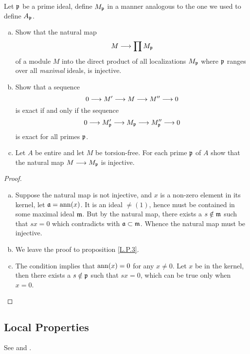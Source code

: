   \begin{ex}\label{3.ex10}
    Let $\mathfrak{p}$ be a prime ideal, define $M_{\mathfrak{p}}$ in a manner analogous to the one we used to define $A_{\mathfrak{p}}$.
    \begin{enumerate}[a)]
      \item Show that the natural map
               \begin{equation*}
                 M\longrightarrow\prod M_{\mathfrak{p}}
               \end{equation*}
               of a module $M$ into the direct product of all localizations $M_{\mathfrak{p}}$ where $\mathfrak{p}$ ranges over all \emph{maximal} ideals, is injective.
      \item Show that a sequence
               \begin{equation*}
                 0\longrightarrow {M'} \stackrel{{{}}}{\longrightarrow} {M} \stackrel{{{}}}{\longrightarrow} {M''} \longrightarrow 0
               \end{equation*}
               is exact if and only if the sequence
               \begin{equation*}
                 0\longrightarrow {M'_{\mathfrak{p}}} \stackrel{{{}}}{\longrightarrow} {M_{\mathfrak{p}}} \stackrel{{{}}}{\longrightarrow} {M''_{\mathfrak{p}}} \longrightarrow 0
               \end{equation*}
               is exact for all primes $\mathfrak{p}$.
      \item Let $A$ be entire and let $M$ be torsion-free. For each prime $\mathfrak{p}$ of $A$ show that the natural map $M\longrightarrow M_{\mathfrak{p}}$ is injective.
    \end{enumerate}
  \end{ex}
  \begin{proof}
    \begin{enumerate}[a)]
      \item Suppose the natural map is not injective, and $x$ is a non-zero element in its kernel, let $\mathfrak{a}=\operatorname{ann}(x)$. It is an ideal $\neq(1)$, hence must be contained in some maximal ideal $\mathfrak{m}$. But by the natural map, there exists a $s\notin\mathfrak{m}$ such that $sx=0$ which contradicts with $\mathfrak{a}\subset\mathfrak{m}$. Whence the natural map must be injective.
      \item We leave the proof to proposition \ref{L.P.3}.
      \item The condition implies that $\operatorname{ann}(x)=0$ for any $x\neq0$. Let $x$ be in the kernel, then there exists a $s\notin \mathfrak{p}$ such that $sx=0$, which can be true only when $x=0$.
    \end{enumerate}
  \end{proof}

\subsection{Local Properties}
  See \cite{atiyah1994introduction} and \cite{eisenbud1995commutative}.

